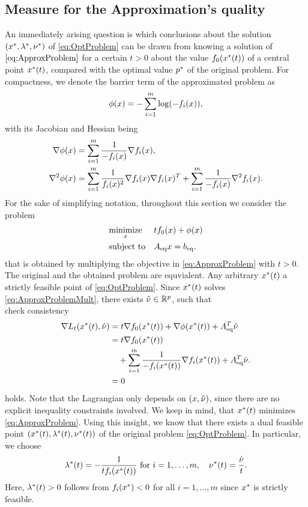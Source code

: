 \subsection{Measure for the Approximation's quality}
An immediately arising question is which conclusions about the solution $ (x^*,\lambda^*, \nu^*) $ of \eqref{eq:OptProblem} can be drawn from knowing a solution of $ \eqref{eq:ApproxProblem} $ for a certain $ t>0 $ about the value $ f_0(x^*(t)) $  of a central point $ x^*(t) $, compared with the optimal value $ p^* $ of the original problem. 
For compactness, we denote the barrier term of the approximated problem as
\[ \phi(x) = - \sum_{i=1}^{m} \log(-f_i(x)),\] with its Jacobian and Hessian being
\begin{align*}
	\nabla \phi(x)&= \sum_{i=1}^{m} \frac{1}{-f_i(x)} \nabla f_i(x),\\
	\nabla^2 \phi(x) &= \sum_{i=1}^{m} \frac{1}{f_i(x)^2} \nabla f_i(x) \nabla f_i(x)^T + \sum_{i=1}^{m}\frac{1}{-f_i(x)} \nabla^2 f_i (x).
\end{align*}
For the sake of simplifying notation, throughout this section we consider the problem
\begin{equation}
	\begin{aligned} & \underset{x}{\text{minimize}} & & tf_0(x) + \phi(x) \\ & \text{subject to} & &{A}_{\mathrm{eq}} x = {b}_{\mathrm{eq}}. \end{aligned} \label{eq:ApproxProblemMult}
\end{equation}
that is obtained by multiplying the objective in \eqref{eq:ApproxProblem} with $ t>0 $. The original and the obtained problem are equvialent.
Any arbitrary $ x^*(t) $ a strictly feasible point of \eqref{eq:OptProblem}. Since $ x^*(t) $ solves \eqref{eq:ApproxProblemMult}, there exists $ \hat{\nu} \in \mathbb{R}^p$, such that\\
\todo check consistency
\begin{align}
	\nabla L_t(x^*(t), \hat{\nu}) &= t \nabla f_0(x^*(t)) + \nabla \phi(x^*(t)) + {A}_{\mathrm{eq}} ^T \hat{\nu}\\
					&= t\nabla f_0 (x^*(t)) \notag\\&\quad+ \sum_{i=1}^{m} \frac{1}{-f_i(x^*(t))} \nabla f_i(x^*(t)) + {A}_{\mathrm{eq}}^T \hat{\nu}.\\&=0
					\label{eq:centralPathLagr}
\end{align}
holds. Note that  the Lagrangian only depends on $ (x,\hat{\nu}) $, since there are no explicit inequality constraints involved. We keep in mind, that $ x^*(t) $ minimizes \eqref{eq:ApproxProblem}.
Using this insight, we know that there exists a dual feasible point $ (x^*(t),\lambda^*(t), \nu^*(t)) $ of the original problem \eqref{eq:OptProblem}. In particular, we choose
\begin{gather*}
	\lambda^*(t) = -\frac{1}{tf_i(x^*(t))}\text{ for }i=1,\dots,m,\quad \nu^*(t)= \frac{\hat{\nu}}{t}.
\end{gather*}
Here, $ \lambda^*(t) > 0 $ follows from $ f_i(x^*) < 0 $ for all $ i = 1,\dots,m $ since $ x^*  $ is strictly feasible.


